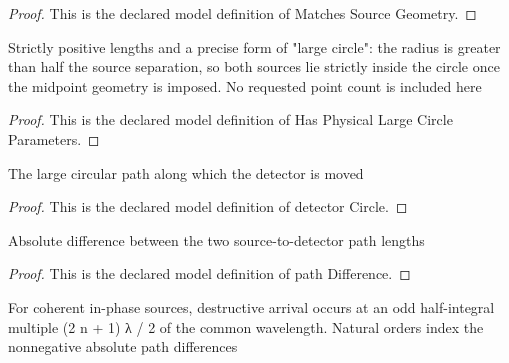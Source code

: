 \begin{proof}
  This is the declared model definition of Matches Source Geometry.
\end{proof}
\begin{definition}
  \label{def:physics:phyx-mini-0312:phyxminiproblems-problemphyxmini0312-hasphysicallargecircleparameters}
  Strictly positive lengths and a precise form of "large circle": the radius is greater than half the source separation, so both sources lie strictly inside the circle once the midpoint geometry is imposed. No requested point count is included here
\end{definition}
\begin{proof}
  This is the declared model definition of Has Physical Large Circle Parameters.
\end{proof}
\begin{definition}
  \label{def:physics:phyx-mini-0312:phyxminiproblems-problemphyxmini0312-detectorcircle}
  The large circular path along which the detector is moved
\end{definition}
\begin{proof}
  This is the declared model definition of detector Circle.
\end{proof}
\begin{definition}
  \label{def:physics:phyx-mini-0312:phyxminiproblems-problemphyxmini0312-pathdifference}
  Absolute difference between the two source-to-detector path lengths
\end{definition}
\begin{proof}
  This is the declared model definition of path Difference.
\end{proof}
\begin{definition}
  \label{def:physics:phyx-mini-0312:phyxminiproblems-problemphyxmini0312-isoddhalfwavelengthpathdifference}
  For coherent in-phase sources, destructive arrival occurs at an odd half-integral multiple (2 n + 1) λ / 2 of the common wavelength. Natural orders index the nonnegative absolute path differences
\end{definition}
